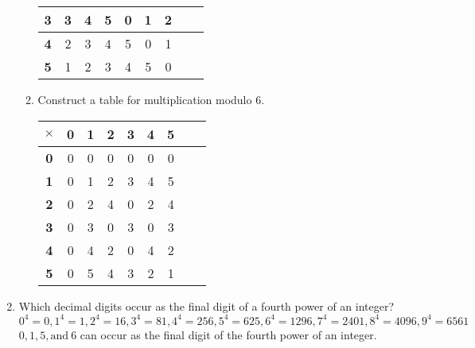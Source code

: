 \documentclass{article}
\begin{document}
\begin{enumerate}
\begin{enumerate}
\begin{tabular}{c|c|c|c|c|c|c|c|c}
                              \textbf{3} & 3          & 4          & 5          & 0          & 1          & 2          \\ \hline
                              \textbf{4} & 2          & 3          & 4          & 5          & 0          & 1          \\ \hline
                              \textbf{5} & 1          & 2          & 3          & 4          & 5          & 0          \\ \hline
                        \end{tabular}
                  \item Construct a table for multiplication modulo 6.\\
                        \begin{tabular}{c|c|c|c|c|c|c|c|c}
                              $\times$   & \textbf{0} & \textbf{1} & \textbf{2} & \textbf{3} & \textbf{4} & \textbf{5} \\ \hline
                              \textbf{0} & 0          & 0          & 0          & 0          & 0          & 0          \\ \hline
                              \textbf{1} & 0          & 1          & 2          & 3          & 4          & 5          \\ \hline
                              \textbf{2} & 0          & 2          & 4          & 0          & 2          & 4          \\ \hline
                              \textbf{3} & 0          & 3          & 0          & 3          & 0          & 3          \\ \hline
                              \textbf{4} & 0          & 4          & 2          & 0          & 4          & 2          \\ \hline
                              \textbf{5} & 0          & 5          & 4          & 3          & 2          & 1          \\ \hline
                        \end{tabular}
            \end{enumerate}
      \item Which decimal digits occur as the final digit of a fourth power of an integer?\\
            $0^{4} = 0, 1^{4} = 1, 2^{4} = 16, 3^{4} = 81, 4^{4} = 256, 5^{4} = 625, 6^{4} = 1296, 7^{4} = 2401, 8^{4} = 4096, 9^{4} = 6561$\\
            $0, 1, 5, \text{and}\ 6$ can occur as the final digit of the fourth power of an integer.

\end{enumerate}
\end{document}
